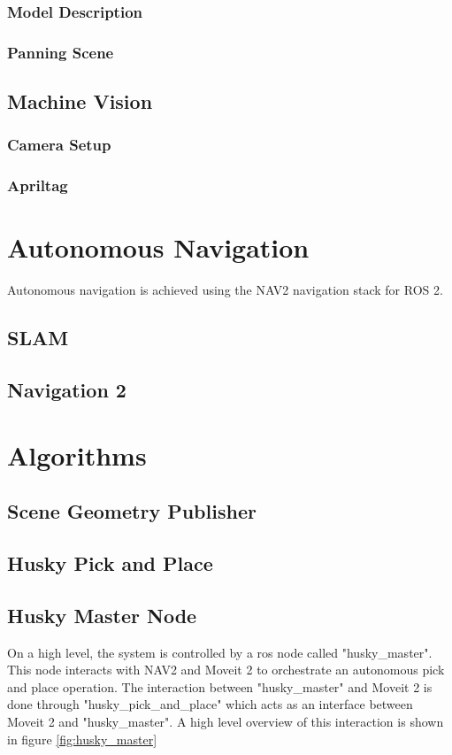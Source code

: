 \subsubsection{Model Description}
\subsubsection{Panning Scene}

\subsection{Machine Vision}
\subsubsection{Camera Setup}
\subsubsection{Apriltag}


\section{Autonomous Navigation}
Autonomous navigation is achieved using the NAV2 navigation stack for ROS 2.

\subsection{SLAM}

\subsection{Navigation 2}



\section{Algorithms}

\subsection{Scene Geometry Publisher}

\subsection{Husky Pick and Place}


\subsection{Husky Master Node}
On a high level, the system is controlled by a ros node called "husky\_master". This node interacts with NAV2 and Moveit 2 to orchestrate an autonomous pick and place operation. The interaction between "husky\_master" and Moveit 2 is done through "husky\_pick\_and\_place" which acts as an interface between Moveit 2 and "husky\_master". A high level overview of this interaction is shown in figure \ref{fig:husky_master}

